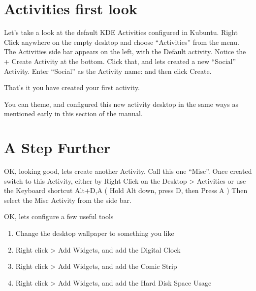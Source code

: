 \documentclass[letterpaper,10pt,english]{sphinxmanual}
\begin{document}
\section{Activities first look}
\label{\detokenize{docs/advanced:activities-first-look}}

\sphinxAtStartPar
Let’s take a look at the default KDE Activities configured in Kubuntu. Right Click anywhere on the empty desktop and choose “Activities” from the menu. The Activities side bar appears on the left, with the Default activity. Notice the + Create Activity at the bottom. Click that, and lets created a new “Social” Activity.
Enter “Social” as the Activity name: and then click Create.

\sphinxAtStartPar
That’s it you have created your first activity.

\sphinxAtStartPar
You can theme, and configured this new activity desktop in the same ways as mentioned early in this section of the manual.


\section{A Step Further}
\label{\detokenize{docs/advanced:a-step-further}}
\sphinxAtStartPar
OK, looking good, lets create another Activity. Call this one “Misc”. Once created switch to this Activity, either by Right Click on the Desktop \textgreater{} Activities or use the Keyboard shortcut Alt+D,A ( Hold Alt down, press D, then Press A )
Then select the Misc Activity from the side bar.

\sphinxAtStartPar
OK, lets configure a few useful tools
\begin{enumerate}
%
\item {} 
\sphinxAtStartPar
Change the desktop wallpaper to something you like

\item {} 
\sphinxAtStartPar
Right click \textgreater{} Add Widgets, and add the Digital Clock

\item {} 
\sphinxAtStartPar
Right click \textgreater{} Add Widgets, and add the Comic Strip

\item {} 
\sphinxAtStartPar
Right click \textgreater{} Add Widgets, and add the Hard Disk Space Usage

\end{enumerate}
\end{document}
